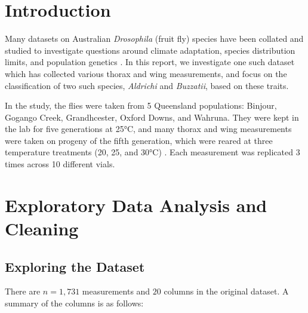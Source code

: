 



\begin{titlingpage}
    \maketitle
\end{titlingpage}

\tableofcontents

\newpage
\section{Introduction}

Many datasets on Australian \textit{Drosophila} (fruit fly) species have been collated and studied to investigate questions around climate adaptation, species distribution limits, and population genetics \parencite{datasetcollections}. In this report, we investigate one such dataset \parencite{dataset} which has collected various thorax and wing measurements, and focus on the classification of two such species, \textit{Aldrichi} and \textit{Buzzatii}, based on these traits. 

In the study, the flies were taken from 5 Queensland populations: Binjour, Gogango Creek, Grandhcester, Oxford Downs, and Wahruna. They were kept in the lab for five generations at 25°C, and many thorax and wing measurements were taken on progeny of the fifth generation, which were reared at three temperature treatments (20, 25, and 30°C) \parencite{datasetcollections}. Each measurement was replicated 3 times across 10 different vials.

\section{Exploratory Data Analysis and Cleaning}

\subsection{Exploring the Dataset}

There are $n = 1,731$ measurements and $20$ columns in the original dataset. A summary of the columns is as follows:

